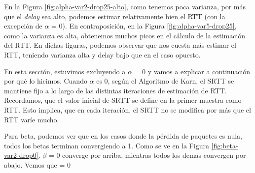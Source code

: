 En la Figura \ref{fig:alpha-var2-drop25-alto}, como tenemos poca varianza, por más que el \emph{delay} sea alto, podemos estimar relativamente bien el RTT (con la excepción de $\alpha$ = 0). En contraposición, en la Figura \ref{fig:alpha-var5-drop25}, como la varianza es alta, obtenemos  muchos picos en el cálculo de la estimación del RTT. En dichas figuras, podemos observar que nos cuesta más estimar el RTT, teniendo varianza alta y delay bajo que en el caso opuesto.

En esta sección, estuvimos excluyendo a $\alpha$ = 0 y vamos a explicar a continuación por qué lo hicimos. Cuando $\alpha$ es 0, según el Algoritmo de Karn, el SRTT se mantiene fijo a lo largo de las distintas iteraciones de estimación de RTT. Recordamos, que el valor inicial de SRTT se define en la primer muestra como RTT. Esto implica, que en cada iteración, el SRTT no se modifica por más que el RTT varíe mucho.


Para beta, podemos ver que en los casos donde la p\'erdida de paquetes es nula, todos los betas terminan convergiendo a 1. Como se ve en la Figura \ref{fig:beta-var2-drop0}. $\beta$ = 0 converge por arriba, mientras todos los demas convergen por abajo. Vemos que \beta = 0